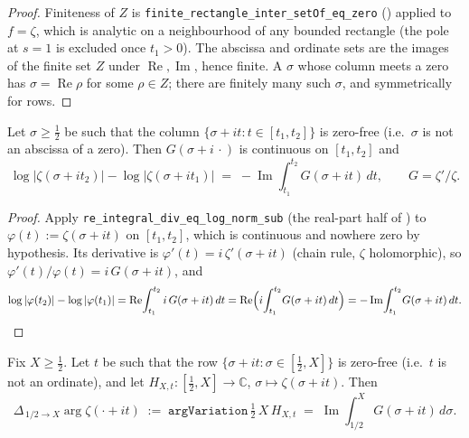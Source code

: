 \begin{proof}
\leanok
{}
Finiteness of $Z$ is \texttt{finite\_rectangle\_inter\_setOf\_eq\_zero}
() applied to $f=\zeta$, which is analytic on a
neighbourhood of any bounded rectangle (the pole at $s=1$ is excluded once
$t_1>0$). The abscissa and ordinate sets are the images of the finite set $Z$
under $\operatorname{Re},\operatorname{Im}$, hence finite. A $\sigma$ whose column
meets a zero has $\sigma=\operatorname{Re}\rho$ for some $\rho\in Z$; there are
finitely many such $\sigma$, and symmetrically for rows.
\end{proof}

\begin{lemma}
\label{lem:lb_logNorm_diff}
\leanok
{}
Let $\sigma\ge\tfrac12$ be such that the column $\{\sigma+it:t\in[t_1,t_2]\}$ is
zero-free (i.e.\ $\sigma$ is not an abscissa of a zero). Then $G(\sigma+i\,\cdot)$
is continuous on $[t_1,t_2]$ and
\[
  \log\bigl|\zeta(\sigma+it_2)\bigr|-\log\bigl|\zeta(\sigma+it_1)\bigr|
  \;=\; -\operatorname{Im}\!\int_{t_1}^{t_2} G(\sigma+it)\,dt ,
  \qquad G=\zeta'/\zeta .
\]
\end{lemma}

\begin{proof}
\leanok
{}
Apply \texttt{re\_integral\_div\_eq\_log\_norm\_sub} (the real-part half of
) to $\varphi(t):=\zeta(\sigma+it)$ on $[t_1,t_2]$, which is
continuous and nowhere zero by hypothesis. Its derivative is
$\varphi'(t)=i\,\zeta'(\sigma+it)$ (chain rule, $\zeta$ holomorphic), so
$\varphi'(t)/\varphi(t)=i\,G(\sigma+it)$, and
\[
  \log|\varphi(t_2)|-\log|\varphi(t_1)|
  =\operatorname{Re}\!\int_{t_1}^{t_2} i\,G(\sigma+it)\,dt
  =\operatorname{Re}\Bigl(i\!\int_{t_1}^{t_2}\!G(\sigma+it)\,dt\Bigr)
  =-\operatorname{Im}\!\int_{t_1}^{t_2}\!G(\sigma+it)\,dt . \qedhere
\]
\end{proof}

\begin{lemma}
\label{lem:lb_horiz_argVar}
\leanok
{}
Fix $X\ge\tfrac12$. Let $t$ be such that the row
$\{\sigma+it:\sigma\in[\tfrac12,X]\}$ is zero-free
(i.e.\ $t$ is not an ordinate), and let $H_{X,t}:[\tfrac12,X]\to\mathbb{C}$,
$\sigma\mapsto\zeta(\sigma+it)$. Then
\[
  \Delta_{\,1/2\to X}\arg\zeta(\cdot+it)
  \;:=\; \texttt{argVariation}\,\tfrac12\,X\,H_{X,t}
  \;=\; \operatorname{Im}\!\int_{1/2}^{X} G(\sigma+it)\,d\sigma .
\]
\end{lemma}

